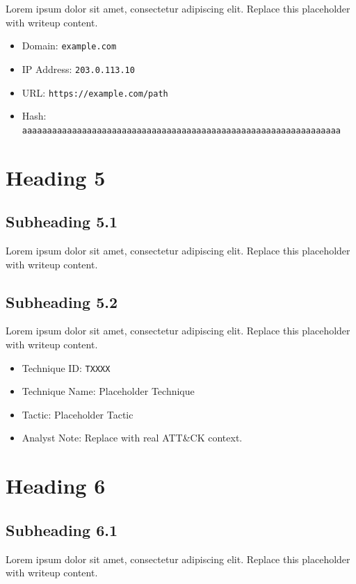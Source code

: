 \documentclass[11pt,a4paper]{article}
\let\oldsection\section
\renewcommand{\section}{\clearpage\oldsection}
\newcommand{\placeholder}{\textcolor{muted}{Lorem ipsum dolor sit amet, consectetur adipiscing elit. Replace this placeholder with writeup content.}}
\newcommand{\inlinecode}[1]{\texttt{\textcolor{accent}{#1}}}
\begin{document}
\placeholder

\begin{iocbox}
\begin{itemize}
    \item Domain: \inlinecode{example.com}
    \item IP Address: \inlinecode{203.0.113.10}
    \item URL: \inlinecode{https://example.com/path}
    \item Hash: \inlinecode{aaaaaaaaaaaaaaaaaaaaaaaaaaaaaaaaaaaaaaaaaaaaaaaaaaaaaaaaaaaaaaaa}
\end{itemize}
\end{iocbox}

\section{Heading 5}

\subsection{Subheading 5.1}

\placeholder

\subsection{Subheading 5.2}

\placeholder

\begin{mitrebox}
\begin{itemize}
    \item Technique ID: \inlinecode{TXXXX}
    \item Technique Name: Placeholder Technique
    \item Tactic: Placeholder Tactic
    \item Analyst Note: Replace with real ATT\&CK context.
\end{itemize}
\end{mitrebox}

\section{Heading 6}

\subsection{Subheading 6.1}

\placeholder
\end{document}
